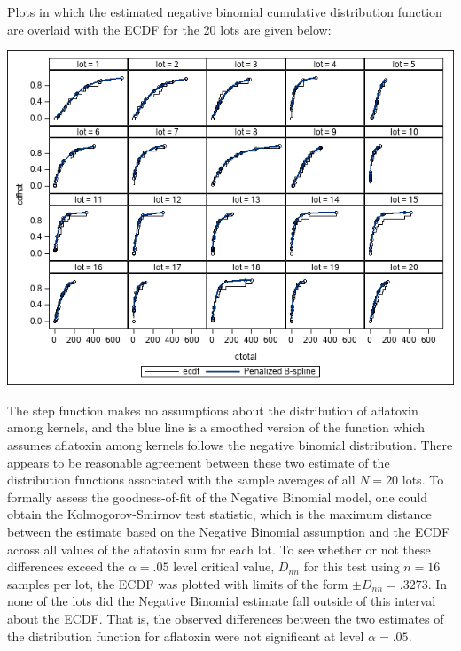\documentclass{article}
\begin{document}
Plots in which the estimated negative binomial cumulative distribution function are
overlaid with the ECDF for the 20 lots are given below: \\

\begin{center}
\includegraphics[scale=.7]{SGPanel5x4.png}
\end{center}

The step function makes no assumptions about the distribution of
aflatoxin among kernels, and the blue line is a smoothed version of the
function which assumes aflatoxin among kernels follows the negative binomial
distribution.  
There appears to be reasonable agreement between these two estimate of the
distribution functions associated with the sample averages of all $N=20$
lots.  
%
%
{\blue
To formally assess the goodness-of-fit of the Negative Binomial model, one
could obtain the Kolmogorov-Smirnov test statistic, which is the maximum
distance between the estimate based on the Negative Binomial assumption and
the ECDF across all values of the aflatoxin sum for each lot.  To see
whether or not these differences exceed the $\alpha=.05$ level critical 
value, $D_{nn}$ for this test using $n=16$ samples per lot, the ECDF was 
plotted with limits of the form $\pm D_{nn}=.3273$.  In none of the lots
did the Negative Binomial estimate fall outside of this interval about
the ECDF.  That is, the observed differences between the two estimates
of the distribution function for aflatoxin were not significant at level
$\alpha=.05$.}
 
\end{document}
